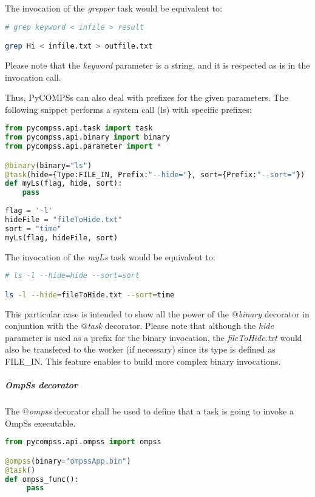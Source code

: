 The invocation of the {\it grepper} task would be equivalent to:

\begin{lstlisting}[language=bash]
# grep keyword < infile > result

grep Hi < infile.txt > outfile.txt
\end{lstlisting}

Please note that the {\it keyword} parameter is a string, and it is respected as is in the invocation call.

Thus, PyCOMPSs can also deal with prefixes for the given parameters. 
The following snippet performs a system call (ls) with specific prefixes:

\begin{lstlisting}[language=python]
from pycompss.api.task import task
from pycompss.api.binary import binary
from pycompss.api.parameter import *

@binary(binary="ls")
@task(hide={Type:FILE_IN, Prefix:"--hide="}, sort={Prefix:"--sort="})
def myLs(flag, hide, sort):
    pass
    
flag = '-l'
hideFile = "fileToHide.txt"
sort = "time"
myLs(flag, hideFile, sort)
\end{lstlisting}

The invocation of the {\it myLs} task would be equivalent to:

\begin{lstlisting}[language=bash]
# ls -l --hide=hide --sort=sort

ls -l --hide=fileToHide.txt --sort=time
\end{lstlisting}

This particular case is intended to show all the power of the {\it $@$binary} decorator in conjuntion with the
{\it $@$task} decorator. Please note that although the {\it hide} parameter is used as a prefix for the binary invocation,
the {\it fileToHide.txt} would also be transfered to the worker (if necessary) since its type is defined as FILE\_IN. 
This feature enables to build more complex binary invocations.



\subparagraph{OmpSs decorator}
\label{subpar:ompss_decorator}

The {\it $@$ompss} decorator shall be used to define that a task is going to invoke a OmpSs executable.

\begin{lstlisting}[language=python]
from pycompss.api.ompss import ompss

@ompss(binary="ompssApp.bin")
@task()
def ompss_func():
     pass
\end{lstlisting}

